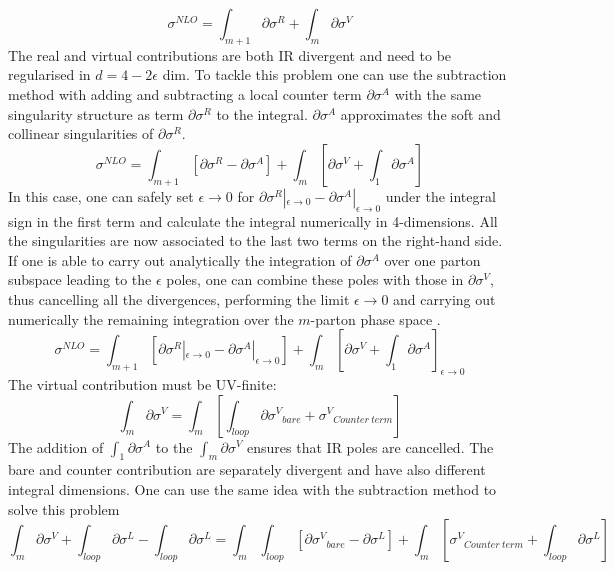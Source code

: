 \begin{equation}
\sigma^{NLO} = \int_{m+1} \partial \sigma^R +\int_{m} \partial \sigma^V
\end{equation}
The real and virtual contributions are both IR divergent and need to be regularised in $ d = 4-2\epsilon $ dim.
To tackle this problem one can use the subtraction method with adding and subtracting a local counter term $ \partial \sigma^A $ with the same singularity structure as term $ \partial \sigma^R $ to the integral. $ \partial \sigma^A $ approximates the soft and collinear singularities of $ \partial \sigma^R  $.
\begin{equation}
\sigma^{NLO} = \int_{m+1} [\partial \sigma^R -\partial \sigma^A]+\int_{m} [\partial \sigma^V+\int_1 \partial \sigma^A]
\end{equation}
In this case, one can safely set $ \epsilon \rightarrow 0 $ for $ \partial \sigma^R |_{\epsilon \rightarrow 0}  -\partial \sigma^A |_{\epsilon \rightarrow 0} $ under the integral sign in the first term and calculate the integral numerically in 4-dimensions. All the singularities are now associated to the last two terms on the right-hand side. If one is able to carry out analytically the integration of $ \partial \sigma^A $ over one parton subspace leading to the $ \epsilon $ poles, one can combine these poles with those in $ \partial \sigma^V $, thus cancelling all the divergences, performing the limit $ {\epsilon \rightarrow 0} $ and carrying out numerically the remaining integration over the $ m $-parton phase space \cite{Catani:2002hc}. 
\begin{equation}
\sigma^{NLO} = \int_{m+1} [\partial \sigma^R |_{\epsilon \rightarrow 0}  -\partial \sigma^A |_{\epsilon \rightarrow 0}]+\int_{m} [\partial \sigma^V+\int_1 \partial \sigma^A]_{\epsilon \rightarrow 0}
\end{equation}
The virtual contribution must be UV-finite:
\begin{equation}
\int_{m} \partial \sigma^V= \int_m [\int_{loop} \partial {\sigma^V}_{bare} + {\sigma^V}_{Counter\:term}]
\end{equation}
The addition of $\int_1 \partial \sigma^A$ to the $ \int_{m} \partial \sigma^V $ ensures that IR poles are cancelled.
The bare and counter contribution are separately divergent and have also different integral dimensions. One can use the same idea with the subtraction method to solve this problem~\cite{Catani:1996vz}
\begin{equation}
\int_{m} \partial \sigma^V +\int_{loop} \partial {\sigma^L}-\int_{loop} \partial {\sigma^L}= \int_m \int_{loop}[ \partial {\sigma^V}_{bare}- \partial {\sigma^L}] + \int_m[{\sigma^V}_{Counter\:term}+ \int_{loop} \partial {\sigma^L}]
\end{equation}

